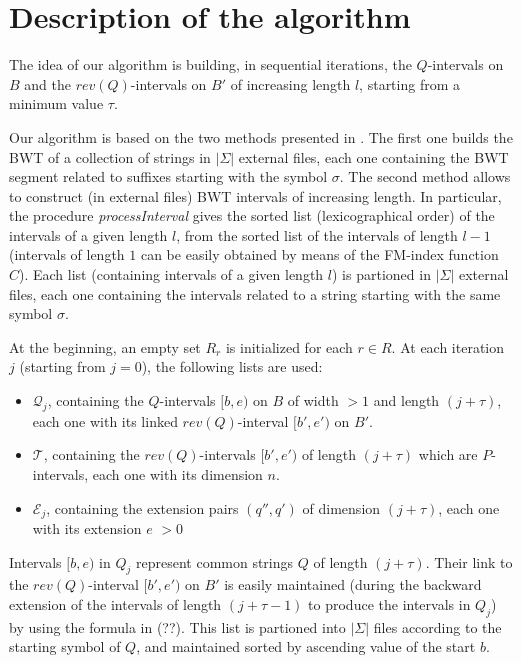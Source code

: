 \documentclass[runningheads,envcountsame,a4paper]{llncs}
\begin{document}
\section*{Description of the algorithm}

The idea of our algorithm is building, in sequential iterations, the $Q$-intervals on $B$ and the $rev(Q)$-intervals on $B'$ of increasing length $l$, starting from a minimum value $\tau$.

Our algorithm is based on the two methods presented in \cite{Bauer11, Cox12}. The first one builds the BWT of a collection of strings in $|\Sigma|$ external files, each one containing the BWT segment related to suffixes starting with the symbol $\sigma$. The second method allows to construct (in external files) BWT intervals of increasing length.
In particular, the procedure \emph{processInterval} gives the sorted list (lexicographical order) of the intervals of a given length $l$, from the sorted list of the intervals of length $l-1$ (intervals of length $1$ can be easily obtained by means of the FM-index function $C$).
Each list (containing intervals of a given length $l$) is partioned in $|\Sigma|$ external files, each one containing the intervals related to a string starting with the same symbol $\sigma$.

At the beginning, an empty set $R_r$ is initialized for each $r \in R$. At each iteration $j$ (starting from $j=0$), the following lists are used:
\begin{itemize}
\item $\mathcal{Q}_j$, containing the $Q$-intervals $[b, e)$ on $B$ of width $>1$ and length $(j+\tau)$, each one with its linked $rev(Q)$-interval $[b', e')$ on $B'$.
\item $\mathcal{T}$, containing the $rev(Q)$-intervals $[b', e')$ of length $(j+\tau)$ which are $P$-intervals, each one with its dimension $n$.
\item $\mathcal{E}_j$, containing the extension pairs $(q'', q')$ of dimension $(j+\tau)$, each one with its extension $e$ $> 0$
\end{itemize}

Intervals $[b,e)$ in $Q_j$ represent common strings $Q$ of length $(j+\tau)$.
Their link to the $rev(Q)$-interval $[b',e')$ on $B'$ is easily maintained (during the backward extension of the intervals of length $(j+\tau-1)$ to produce the intervals in $Q_j$) by using the formula in (??). This list is partioned into $|\Sigma|$ files according to the starting symbol of $Q$, and maintained sorted by ascending value of the start $b$.
\end{document}
